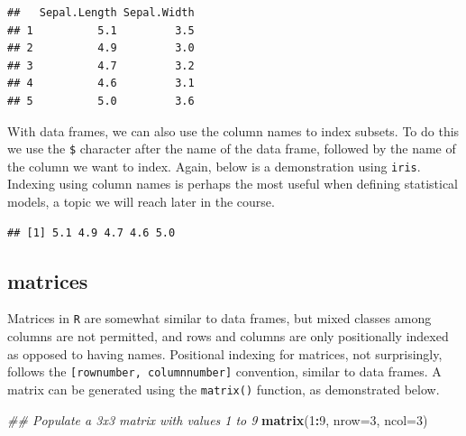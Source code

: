\documentclass[]{book}
\newenvironment{Shaded}{\begin{snugshade}}{\end{snugshade}}
\newcommand{\CommentTok}[1]{\textcolor[rgb]{0.56,0.35,0.01}{\textit{#1}}}
\newcommand{\DataTypeTok}[1]{\textcolor[rgb]{0.13,0.29,0.53}{#1}}
\newcommand{\DecValTok}[1]{\textcolor[rgb]{0.00,0.00,0.81}{#1}}
\newcommand{\KeywordTok}[1]{\textcolor[rgb]{0.13,0.29,0.53}{\textbf{#1}}}
\newcommand{\NormalTok}[1]{#1}
\newcommand{\OperatorTok}[1]{\textcolor[rgb]{0.81,0.36,0.00}{\textbf{#1}}}
\begin{document}
\begin{verbatim}
##   Sepal.Length Sepal.Width
## 1          5.1         3.5
## 2          4.9         3.0
## 3          4.7         3.2
## 4          4.6         3.1
## 5          5.0         3.6
\end{verbatim}

With data frames, we can also use the column names to index subsets. To do this we use the \texttt{\$} character after the name of the data frame, followed by the name of the column we want to index. Again, below is a demonstration using \texttt{iris}. Indexing using column names is perhaps the most useful when defining statistical models, a topic we will reach later in the course.

\begin{Shaded}
\end{Shaded}

\begin{verbatim}
## [1] 5.1 4.9 4.7 4.6 5.0
\end{verbatim}

\hypertarget{matrices}{%
\subsection{matrices}\label{matrices}}

Matrices in \texttt{R} are somewhat similar to data frames, but mixed classes among columns are not permitted, and rows and columns are only positionally indexed as opposed to having names. Positional indexing for matrices, not surprisingly, follows the \texttt{{[}rownumber,\ columnnumber{]}} convention, similar to data frames. A matrix can be generated using the \texttt{matrix()} function, as demonstrated below.

\begin{Shaded}
\begin{Highlighting}[]
\CommentTok{## Populate a 3x3 matrix with values 1 to 9}
\KeywordTok{matrix}\NormalTok{(}\DecValTok{1}\OperatorTok{:}\DecValTok{9}\NormalTok{, }\DataTypeTok{nrow=}\DecValTok{3}\NormalTok{, }\DataTypeTok{ncol=}\DecValTok{3}\NormalTok{)}
\end{Highlighting}
\end{Shaded}
\end{document}
